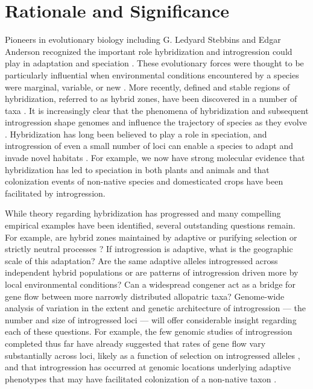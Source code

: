\section*{Rationale and Significance} 
Pioneers in evolutionary biology including G. Ledyard Stebbins and Edgar Anderson recognized the important role hybridization and introgression could play in adaptation and speciation \citep{Anderson1948, Anderson1954}.
These evolutionary forces were thought to be particularly influential when environmental conditions encountered by a species were marginal, variable, or new \citep{Stebbins1959}.
More recently, defined and stable regions of hybridization, referred to as hybrid zones, have been discovered in a number of taxa \citep[reviewed in ][]{HarrisonHybridZone, shurtliff2013, abbott2014}. 
It is increasingly clear that the phenomena of hybridization and subsequent introgression shape genomes and influence the trajectory of species as they evolve \citep{Ellstrand2014}.
Hybridization has long been believed to play a role in speciation, and introgression of even a small number of loci can enable a species to adapt and invade novel habitats \citep{currat2008, abbott2013}.
For example, we now have strong molecular evidence that hybridization has led to speciation in both plants and animals \citep[reviewed in][]{mallet2007} and that colonization events of non-native species \citep{lucek2010} and domesticated crops \citep{he2011, Hufford2013} have been facilitated by introgression. 

While theory regarding hybridization has progressed and many compelling empirical examples have been identified, several outstanding questions remain. 
For example, are hybrid zones maintained by adaptive or purifying selection or strictly neutral processes \citep{Kruuk1999, Rasmussen2012, Smith2013b}? 
If introgression is adaptive, what is the geographic scale of this adaptation?
Are the same adaptive alleles introgressed across independent hybrid populations or are patterns of introgression driven more by local environmental conditions?
Can a widespread congener act as a bridge for gene flow between more narrowly distributed allopatric taxa? 
Genome-wide analysis of variation in the extent and genetic architecture of introgression --- the number and size of introgressed loci ---  will offer considerable insight regarding each of these questions.  
For example, the few genomic studies of introgression completed thus far have already suggested that rates of gene flow vary substantially across loci, likely as a function of selection on introgressed alleles \citep{Hufford2013, Poelstra2014}, and that introgression has occurred at genomic locations underlying adaptive phenotypes that may have facilitated colonization of a non-native taxon \citep{Hufford2013}.
 
